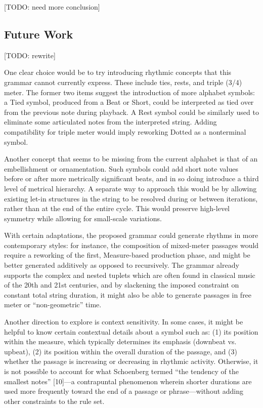 \documentclass{article}
\begin{document}
[TODO: need more conclusion]

\subsection{Future Work}

[TODO: rewrite]

One clear choice would be to try introducing rhythmic concepts that this grammar cannot currently express. These include ties, rests, and triple (3/4) meter. The former two items suggest the introduction of more alphabet symbols: a Tied symbol, produced from a Beat or Short, could be interpreted as tied over from the previous note during playback. A Rest symbol could be similarly used to eliminate some articulated notes from the interpreted string. Adding compatibility for triple meter would imply reworking Dotted as a nonterminal symbol.

Another concept that seems to be missing from the current alphabet is that of an embellishment or ornamentation. Such symbols could add short note values before or after more metrically significant beats, and in so doing introduce a third level of metrical hierarchy. A separate way to approach this would be by allowing existing let-in structures in the string to be resolved during or between iterations, rather than at the end of the entire cycle. This would preserve high-level symmetry while allowing for small-scale variations.

With certain adaptations, the proposed grammar could generate rhythms in more contemporary styles: for instance, the composition of mixed-meter passages would require a reworking of the first, Measure-based production phase, and might be better generated additively as opposed to recursively. The grammar already supports the complex and nested tuplets which are often found in classical music of the 20th and 21st centuries, and by slackening the imposed constraint on constant total string duration, it might also be able to generate passages in free meter or “non-geometric” time.

Another direction to explore is context sensitivity. In some cases, it might be helpful to know certain contextual details about a symbol such as: (1) its position within the measure, which typically determines its emphasis (downbeat vs. upbeat), (2) its position within the overall duration of the passage, and (3) whether the passage is increasing or decreasing in rhythmic activity. Otherwise, it is not possible to account for what Schoenberg termed “the tendency of the smallest notes” [10]—a contrapuntal phenomenon wherein shorter durations are used more frequently toward the end of a passage or phrase—without adding other constraints to the rule set.
\end{document}
